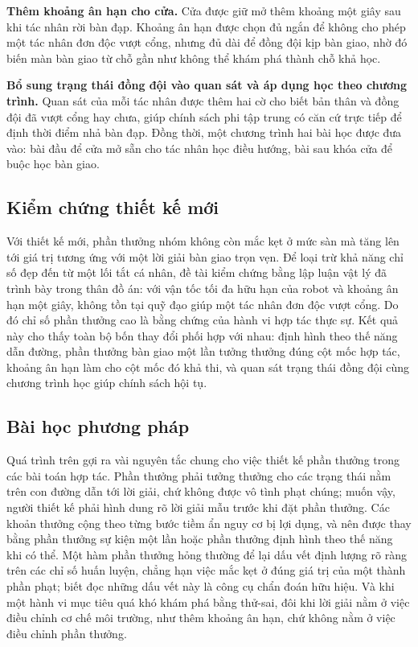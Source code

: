 \indent \textbf{Thêm khoảng ân hạn cho cửa.} Cửa được giữ mở thêm khoảng một
giây sau khi tác nhân rời bàn đạp. Khoảng ân hạn được chọn đủ ngắn để không cho phép một
tác nhân đơn độc vượt cổng, nhưng đủ dài để đồng đội kịp bàn giao, nhờ đó biến màn bàn
giao từ chỗ gần như không thể khám phá thành chỗ khả học.

\indent \textbf{Bổ sung trạng thái đồng đội vào quan sát và áp dụng học theo
chương trình.} Quan sát của mỗi tác nhân được thêm hai cờ cho biết bản thân và đồng đội
đã vượt cổng hay chưa, giúp chính sách phi tập trung có căn cứ trực tiếp để định thời
điểm nhả bàn đạp. Đồng thời, một chương trình hai bài học được đưa vào: bài đầu để cửa
mở sẵn cho tác nhân học điều hướng, bài sau khóa cửa để buộc học bàn giao.

\subsection{Kiểm chứng thiết kế mới}
\indent Với thiết kế mới, phần thưởng nhóm không còn mắc kẹt ở mức sàn mà tăng lên tới
giá trị tương ứng với một lời giải bàn giao trọn vẹn. Để loại trừ khả năng chỉ số đẹp
đến từ một lối tắt cá nhân, đề tài kiểm chứng bằng lập luận vật lý đã trình bày trong
thân đồ án: với vận tốc tối đa hữu hạn của robot và khoảng ân hạn một giây, không tồn
tại quỹ đạo giúp một tác nhân đơn độc vượt cổng. Do đó chỉ số phần thưởng cao là bằng
chứng của hành vi hợp tác thực sự. Kết quả này cho thấy toàn bộ bốn thay đổi phối hợp
với nhau: định hình theo thế năng dẫn đường, phần thưởng bàn giao một lần tưởng thưởng
đúng cột mốc hợp tác, khoảng ân hạn làm cho cột mốc đó khả thi, và quan sát trạng thái
đồng đội cùng chương trình học giúp chính sách hội tụ.

\subsection{Bài học phương pháp}
\indent Quá trình trên gợi ra vài nguyên tắc chung cho việc thiết kế phần thưởng trong
các bài toán hợp tác. Phần thưởng phải tưởng thưởng cho các trạng thái nằm trên
con đường dẫn tới lời giải, chứ không được vô tình phạt chúng; muốn vậy, người
thiết kế phải hình dung rõ lời giải mẫu trước khi đặt phần thưởng. Các khoản
thưởng cộng theo từng bước tiềm ẩn nguy cơ bị lợi dụng, và nên được thay bằng phần
thưởng sự kiện một lần hoặc phần thưởng định hình theo thế năng khi có thể. Một
hàm phần thưởng hỏng thường để lại dấu vết định lượng rõ ràng trên các chỉ số huấn
luyện, chẳng hạn việc mắc kẹt ở đúng giá trị của một thành phần phạt; biết đọc những dấu
vết này là công cụ chẩn đoán hữu hiệu. Và khi một hành vi mục tiêu quá khó khám phá
bằng thử-sai, đôi khi lời giải nằm ở việc điều chỉnh cơ chế môi trường, như thêm
khoảng ân hạn, chứ không nằm ở việc điều chỉnh phần thưởng.
